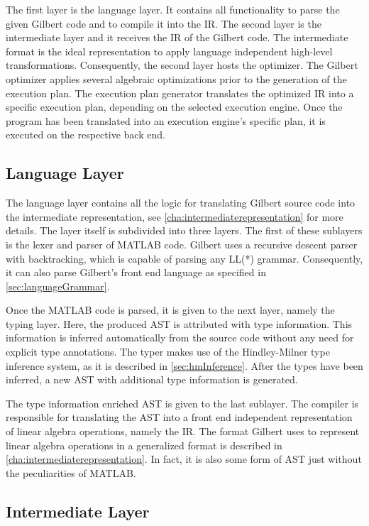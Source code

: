 The first layer is the language layer.
It contains all functionality to parse the given Gilbert code and to compile it into the IR.
The second layer is the intermediate layer and it receives the IR of the Gilbert code.
The intermediate format is the ideal representation to apply language independent high-level transformations.
Consequently, the second layer hosts the optimizer.
The Gilbert optimizer applies several algebraic optimizations prior to the generation of the execution plan.
The execution plan generator translates the optimized IR into a specific execution plan, depending on the selected execution engine.
Once the program has been translated into an execution engine's specific plan, it is executed on the respective back end.

\subsection{Language Layer}

The language layer contains all the logic for translating Gilbert source code into the intermediate representation, see \cref{cha:intermediaterepresentation} for more details.
The layer itself is subdivided into three layers.
The first of these sublayers is the lexer and parser of MATLAB code.
Gilbert uses a recursive descent parser with backtracking, which is capable of parsing any LL(*) grammar.
Consequently, it can also parse Gilbert's front end language as specified in \cref{sec:languageGrammar}.

Once the MATLAB code is parsed, it is given to the next layer, namely the typing layer.
Here, the produced AST is attributed with type information.
This information is inferred automatically from the source code without any need for explicit type annotations.
The typer makes use of the Hindley-Milner type inference system, as it is described in \cref{sec:hmInference}.
After the types have been inferred, a new AST with additional type information is generated.

The type information enriched AST is given to the last sublayer.
The compiler is responsible for translating the AST into a front end independent representation of linear algebra operations, namely the IR.
The format Gilbert uses to represent linear algebra operations in a generalized format is described in \cref{cha:intermediaterepresentation}.
In fact, it is also some form of AST just without the peculiarities of MATLAB.

\subsection{Intermediate Layer}

